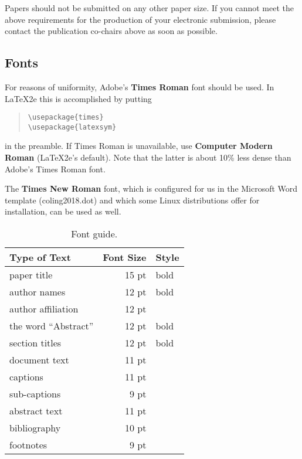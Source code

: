 \noindent Papers should not be submitted on any other paper size.
If you cannot meet the above requirements for
the production of your electronic submission, please contact the
publication co-chairs above as soon as possible.


\subsection{Fonts}

For reasons of uniformity, Adobe's {\bf Times Roman} font should be
used. In \LaTeX2e{} this is accomplished by putting

\begin{quote}
\begin{verbatim}
\usepackage{times}
\usepackage{latexsym}
\end{verbatim}
\end{quote}
in the preamble. If Times Roman is unavailable, use {\bf Computer
  Modern Roman} (\LaTeX2e{}'s default).  Note that the latter is about
  10\% less dense than Adobe's Times Roman font.

The {\bf Times New Roman} font, which is configured for us in the
Microsoft Word template (coling2018.dot) and which some Linux
distributions offer for installation, can be used as well.

\begin{table}[h]
\begin{center}
\begin{tabular}{|l|rl|}
\hline \bf Type of Text & \bf Font Size & \bf Style \\ \hline
paper title & 15 pt & bold \\
author names & 12 pt & bold \\
author affiliation & 12 pt & \\
the word ``Abstract'' & 12 pt & bold \\
section titles & 12 pt & bold \\
document text & 11 pt  &\\
captions & 11 pt & \\
sub-captions & 9 pt & \\
abstract text & 11 pt & \\
bibliography & 10 pt & \\
footnotes & 9 pt & \\
\hline
\end{tabular}
\end{center}
\caption{\label{font-table} Font guide. }
\end{table}

